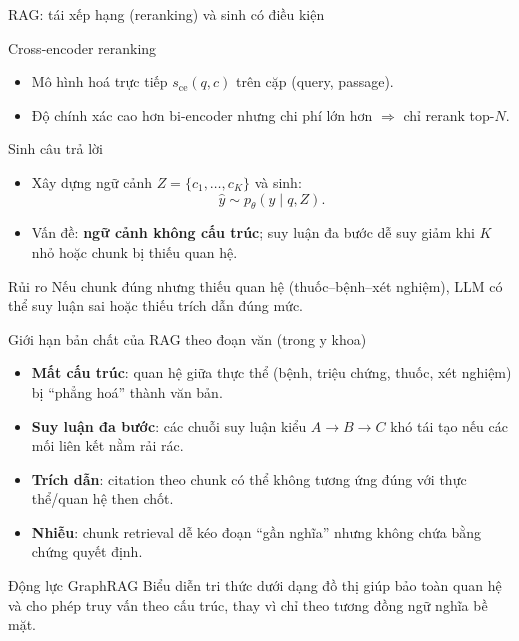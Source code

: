 \documentclass[aspectratio=169,10pt]{beamer}
\begin{document}
\begin{frame}{RAG: tái xếp hạng (reranking) và sinh có điều kiện}
\small
\begin{block}{Cross-encoder reranking}
\begin{itemize}
  \item Mô hình hoá trực tiếp \(s_{\text{ce}}(q,c)\) trên cặp (query, passage).
  \item Độ chính xác cao hơn bi-encoder nhưng chi phí lớn hơn \(\Rightarrow\) chỉ rerank top-\(N\).
\end{itemize}
\end{block}

\begin{block}{Sinh câu trả lời}
\begin{itemize}
  \item Xây dựng ngữ cảnh \(Z=\{c_1,\dots,c_K\}\) và sinh:
  \[
  \hat{y} \sim p_\theta(y\mid q, Z).
  \]
  \item Vấn đề: \textbf{ngữ cảnh không cấu trúc}; suy luận đa bước dễ suy giảm khi \(K\) nhỏ hoặc chunk bị thiếu quan hệ.
\end{itemize}
\end{block}

\begin{block}{Rủi ro}
Nếu chunk đúng nhưng thiếu quan hệ (thuốc--bệnh--xét nghiệm), LLM có thể suy luận sai hoặc thiếu trích dẫn đúng mức.
\end{block}
\end{frame}

\begin{frame}{Giới hạn bản chất của RAG theo đoạn văn (trong y khoa)}
\small
\begin{itemize}
  \item \textbf{Mất cấu trúc}: quan hệ giữa thực thể (bệnh, triệu chứng, thuốc, xét nghiệm) bị ``phẳng hoá'' thành văn bản.
  \item \textbf{Suy luận đa bước}: các chuỗi suy luận kiểu \(A\rightarrow B\rightarrow C\) khó tái tạo nếu các mối liên kết nằm rải rác.
  \item \textbf{Trích dẫn}: citation theo chunk có thể không tương ứng đúng với thực thể/quan hệ then chốt.
  \item \textbf{Nhiễu}: chunk retrieval dễ kéo đoạn ``gần nghĩa'' nhưng không chứa bằng chứng quyết định.
\end{itemize}

\vspace{0.2cm}
\begin{block}{Động lực GraphRAG}
Biểu diễn tri thức dưới dạng đồ thị giúp bảo toàn quan hệ và cho phép truy vấn theo cấu trúc, thay vì chỉ theo tương đồng ngữ nghĩa bề mặt.
\end{block}
\end{frame}
\end{document}
